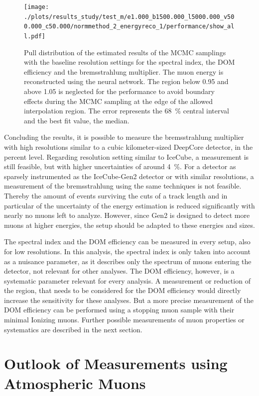 \begin{figure}
    \centering
    \texttt{[image: ./plots/results\_study/test\_m/e1.000\_b1500.000\_l5000.000\_v500.000\_c50.000/normmethod\_2\_energyreco\_1/performance/show\_all.pdf]}
    \caption{Pull distribution of the estimated results of the MCMC samplings with the baseline resolution settings for the spectral index, the DOM efficiency and the bremsstrahlung multiplier. The muon energy is reconstructed using the neural network. The region below 0.95 and above 1.05 is neglected for the performance to avoid boundary effects during the MCMC sampling at the edge of the allowed interpolation region. The error represents the \SI{68}{\%} central interval and the best fit value, the median.}
    \label{fig:study_result_pull}
\end{figure}

Concluding the results, it is possible to measure the bremsstrahlung multiplier with high resolutions similar to a cubic kilometer-sized DeepCore detector, in the percent level.
Regarding resolution setting similar to IceCube, a measurement is still feasible, but with higher uncertainties of around \SI{4}{\%}.
For a detector as sparsely instrumented as the IceCube-Gen2 detector or with similar resolutions, a measurement of the bremsstrahlung using the same techniques is not feasible.
Thereby the amount of events surviving the cuts of a track length and in particular of the uncertainty of the energy estimation is reduced significantly with nearly no muons left to analyze.
However, since Gen2 is designed to detect more muons at higher energies, the setup should be adapted to these energies and sizes.

The spectral index and the DOM efficiency can be measured in every setup, also for low resolutions.
In this analysis, the spectral index is only taken into account as a nuisance parameter, as it describes only the spectrum of muons entering the detector, not relevant for other analyses.
The DOM efficiency, however, is a systematic parameter relevant for every analysis.
A measurement or reduction of the region, that needs to be considered for the DOM efficiency would directly increase the sensitivity for these analyses.
But a more precise measurement of the DOM efficiency can be performed using a stopping muon sample with their minimal Ionizing muons.
Further possible measurements of muon properties or systematics are described in the next section.

%

\section{Outlook of Measurements using Atmospheric Muons} \label{sec:global_muon_fit}

